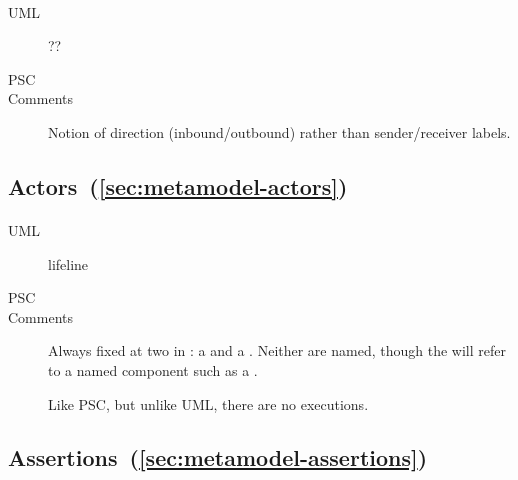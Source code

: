 \paragraph{\mgapmessagespec}
\begin{description}
\item[UML] ??
\item[PSC] 
\item[Comments]
  Notion of direction (inbound/outbound) rather than sender/receiver labels.
\end{description}

\subsection{Actors~(\ref{sec:metamodel-actors})}

\paragraph{\mactor}
\begin{description}
\item[UML] lifeline
\item[PSC] 
\item[Comments]
  Always fixed at two in \langname: a \mtarget{} and a \mworld{}.
  Neither are named, though the \mtarget{} will refer to a
  named component such as a \mrcmodule.

  Like PSC, but unlike UML, there are no executions.
\end{description}

\subsection{Assertions~(\ref{sec:metamodel-assertions})}

